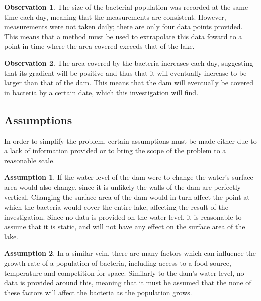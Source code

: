 \documentclass[a4paper]{article}
\theoremstyle{definition}
\newtheorem{assumption}{Assumption}
\newtheorem{observation}{Observation}
\begin{document}
        \begin{observation}
            The size of the bacterial population was recorded at the same time each day, meaning that the measurements are consistent. However, measurements were not taken daily; there are only four data points provided. This means that a method must be used to extrapolate this data foward to a point in time where the area covered exceeds that of the lake.
        \end{observation}

        \begin{observation}
            The area covered by the bacteria increases each day, suggesting that its gradient will be positive and thus that it will eventually increase to be larger than that of the dam. This means that the dam will eventually be covered in bacteria by a certain date, which this investigation will find.
        \end{observation}
    
    \subsection{Assumptions}
    
        In order to simplify the problem, certain assumptions must be made either due to a lack of information provided or to bring the scope of the problem to a reasonable scale.

        \begin{assumption}
            If the water level of the dam were to change the water's surface area would also change, since it is unlikely the walls of the dam are perfectly vertical. Changing the surface area of the dam would in turn affect the point at which the bacteria would cover the entire lake, affecting the result of the investigation. Since no data is provided on the water level, it is reasonable to assume that it is static, and will not have any effect on the surface area of the lake.
        \end{assumption}

        \begin{assumption} \label{asmptnBacteriaGrowth}
            In a similar vein, there are many factors which can influence the growth rate of a population of bacteria, including access to a food source, temperature and competition for space. Similarly to the dam's water level, no data is provided around this, meaning that it must be assumed that the none of these factors will affect the bacteria as the population grows.
        \end{assumption}
        
\end{document}
